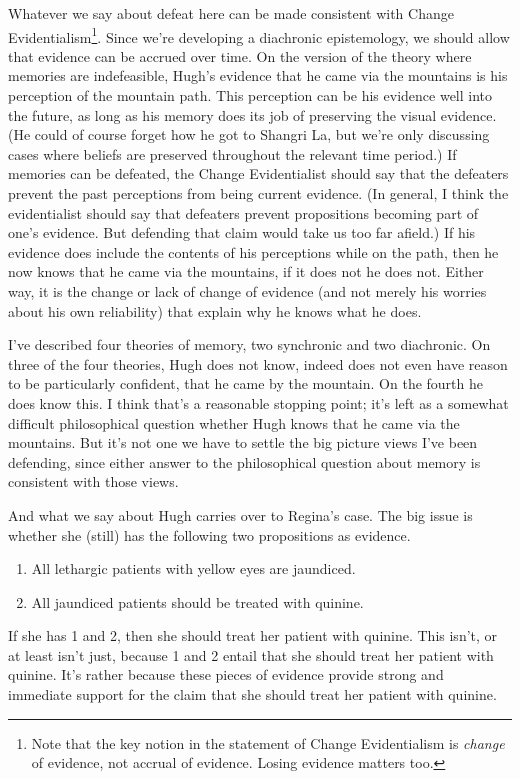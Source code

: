 Whatever we say about defeat here can be made consistent with Change Evidentialism\footnote{Note that the key notion in the statement of Change Evidentialism is \emph{change} of evidence, not accrual of evidence. Losing evidence matters too.}. Since we're developing a diachronic epistemology, we should allow that evidence can be accrued over time. On the version of the theory where memories are indefeasible, \gls{Hugh}'s evidence that he came via the mountains is his perception of the mountain path. This perception can be his evidence well into the future, as long as his memory does its job of preserving the visual evidence. (He could of course forget how he got to Shangri La, but we're only discussing cases where beliefs are preserved throughout the relevant time period.) If memories can be defeated, the Change Evidentialist should say that the defeaters prevent the past perceptions from being current evidence. (In general, I think the evidentialist should say that defeaters prevent propositions becoming part of one's evidence. But defending that claim would take us too far afield.) If his evidence does include the contents of his perceptions while on the path, then he now knows that he came via the mountains, if it does not he does not. Either way, it is the change or lack of change of evidence (and not merely his worries about his own reliability) that explain why he knows what he does.

I've described four theories of memory, two synchronic and two diachronic. On three of the four theories, \gls{Hugh} does not know, indeed does not even have reason to be particularly confident, that he came by the mountain. On the fourth he does know this. I think that's a reasonable stopping point; it's left as a somewhat difficult philosophical question whether \gls{Hugh} knows that he came via the mountains. But it's not one we have to settle the big picture views I've been defending, since either answer to the philosophical question about memory is consistent with those views.

And what we say about \gls{Hugh} carries over to \gls{Regina}'s case. The big issue is whether she (still) has the following two propositions as evidence.

\begin{enumerate}
\item{} All lethargic patients with yellow eyes are jaundiced.

\item{} All jaundiced patients should be treated with quinine.

\end{enumerate}
If she has 1 and 2, then she should treat her patient with quinine. This isn't, or at least isn't just, because 1 and 2 entail that she should treat her patient with quinine. It's rather because these pieces of evidence provide strong and immediate support for the claim that she should treat her patient with quinine.

